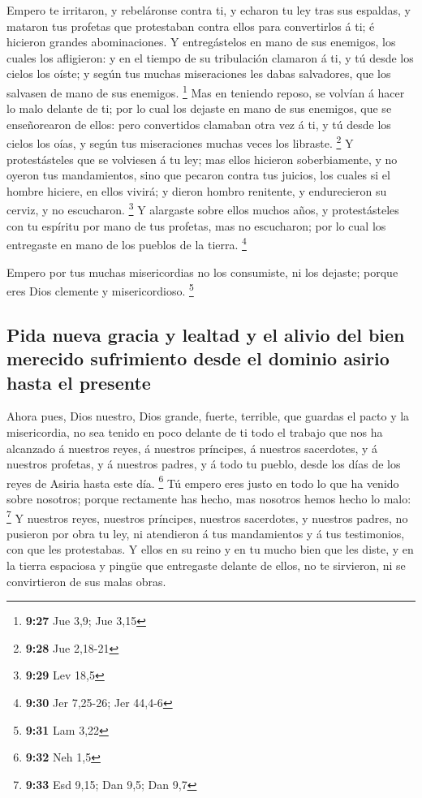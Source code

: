  Empero te irritaron, y rebeláronse contra ti, y echaron tu
ley tras sus espaldas, y mataron tus profetas que protestaban contra
ellos para convertirlos á ti; é hicieron grandes abominaciones.
 Y entregástelos en mano de sus enemigos, los cuales los
afligieron: y en el tiempo de su tribulación clamaron á ti, y tú desde
los cielos los oíste; y según tus muchas miseraciones les dabas
salvadores, que los salvasen de mano de sus enemigos. \footnote{\textbf{9:27}
  Jue 3,9; Jue 3,15}  Mas en teniendo reposo, se volvían á
hacer lo malo delante de ti; por lo cual los dejaste en mano de sus
enemigos, que se enseñorearon de ellos: pero convertidos clamaban otra
vez á ti, y tú desde los cielos los oías, y según tus miseraciones
muchas veces los libraste. \footnote{\textbf{9:28} Jue 2,18-21}
 Y protestásteles que se volviesen á tu ley; mas ellos
hicieron soberbiamente, y no oyeron tus mandamientos, sino que pecaron
contra tus juicios, los cuales si el hombre hiciere, en ellos vivirá; y
dieron hombro renitente, y endurecieron su cerviz, y no escucharon.
\footnote{\textbf{9:29} Lev 18,5}  Y alargaste sobre ellos
muchos años, y protestásteles con tu espíritu por mano de tus profetas,
mas no escucharon; por lo cual los entregaste en mano de los pueblos de
la tierra. \footnote{\textbf{9:30} Jer 7,25-26; Jer 44,4-6}

 Empero por tus muchas misericordias no los consumiste, ni
los dejaste; porque eres Dios clemente y misericordioso. \footnote{\textbf{9:31}
  Lam 3,22}

\hypertarget{pida-nueva-gracia-y-lealtad-y-el-alivio-del-bien-merecido-sufrimiento-desde-el-dominio-asirio-hasta-el-presente}{%
\subsection{Pida nueva gracia y lealtad y el alivio del bien merecido
sufrimiento desde el dominio asirio hasta el
presente}\label{pida-nueva-gracia-y-lealtad-y-el-alivio-del-bien-merecido-sufrimiento-desde-el-dominio-asirio-hasta-el-presente}}

 Ahora pues, Dios nuestro, Dios grande, fuerte, terrible,
que guardas el pacto y la misericordia, no sea tenido en poco delante de
ti todo el trabajo que nos ha alcanzado á nuestros reyes, á nuestros
príncipes, á nuestros sacerdotes, y á nuestros profetas, y á nuestros
padres, y á todo tu pueblo, desde los días de los reyes de Asiria hasta
este día. \footnote{\textbf{9:32} Neh 1,5}  Tú empero eres
justo en todo lo que ha venido sobre nosotros; porque rectamente has
hecho, mas nosotros hemos hecho lo malo: \footnote{\textbf{9:33} Esd
  9,15; Dan 9,5; Dan 9,7}  Y nuestros reyes, nuestros
príncipes, nuestros sacerdotes, y nuestros padres, no pusieron por obra
tu ley, ni atendieron á tus mandamientos y á tus testimonios, con que
les protestabas.  Y ellos en su reino y en tu mucho bien
que les diste, y en la tierra espaciosa y pingüe que entregaste delante
de ellos, no te sirvieron, ni se convirtieron de sus malas obras.

